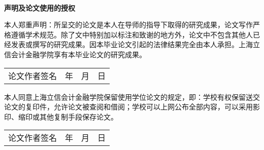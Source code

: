 \clearpage
\thispagestyle{empty}

\
\newline
\begin{center}
	\textbf{声明及论文使用的授权}%
\end{center}
\vspace{1cm}

本人郑重声明：所呈交的论文是本人在导师的指导下取得的研究成果，论文写作严格遵循学术规范。除了文中特别加以标注和致谢的地方外，论文中不包含其他人已经发表或撰写的研究成果。因本毕业论文引起的法律结果完全由本人承担。上海立信会计金融学院享有本毕业论文的研究成果。
\newline
\newline

\begin{tabular}{p{240pt}p{33pt}p{24pt}p{30pt}}
	论文作者签名   &   年  & 月 &  日\\  
\end{tabular}


\vskip 4cm
本人同意上海立信会计金融学院保留使用学位论文的规定，即：学校有权保留送交论文的复印件，允许论文被查阅和借阅；学校可以上网公布全部内容，可以采用影印、缩印或其他复制手段保存论文。
\newline
\newline

\begin{tabular}{p{240pt}p{33pt}p{24pt}p{30pt}}
    论文作者签名   &   年  & 月 &  日\\  
\end{tabular}